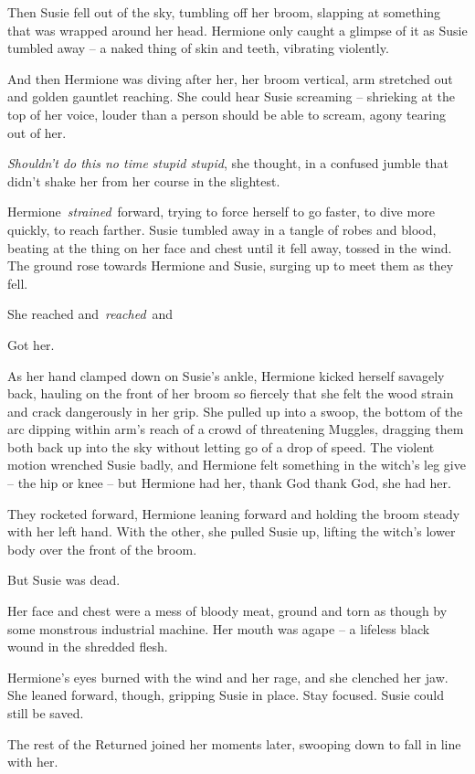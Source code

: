 Then Susie fell out of the sky, tumbling off her broom, slapping at
something that was wrapped around her head. Hermione only caught a
glimpse of it as Susie tumbled away -- a naked thing of skin and teeth,
vibrating violently.

And then Hermione was diving after her, her broom vertical, arm
stretched out and golden gauntlet reaching. She could hear Susie
screaming -- shrieking at the top of her voice, louder than a person
should be able to scream, agony tearing out of her.

\emph{Shouldn't do this no time stupid stupid}, she thought, in a
confused jumble that didn't shake her from her course in the slightest.

Hermione~\emph{strained}~forward, trying to force herself to go faster,
to dive more quickly, to reach farther. Susie tumbled away in a tangle
of robes and blood, beating at the thing on her face and chest until it
fell away, tossed in the wind. The ground rose towards Hermione and
Susie, surging up to meet them as they fell.

She reached and~\emph{reached}~and

Got her.

As her hand clamped down on Susie's ankle, Hermione kicked herself
savagely back, hauling on the front of her broom so fiercely that she
felt the wood strain and crack dangerously in her grip. She pulled up
into a swoop, the bottom of the arc dipping within arm's reach of a
crowd of threatening Muggles, dragging them both back up into the sky
without letting go of a drop of speed. The violent motion wrenched Susie
badly, and Hermione felt something in the witch's leg give -- the hip or
knee -- but Hermione had her, thank God thank God, she had her.

They rocketed forward, Hermione leaning forward and holding the broom
steady with her left hand. With the other, she pulled Susie up, lifting
the witch's lower body over the front of the broom.

But Susie was dead.

Her face and chest were a mess of bloody meat, ground and torn as though
by some monstrous industrial machine. Her mouth was agape -- a lifeless
black wound in the shredded flesh.

Hermione's eyes burned with the wind and her rage, and she clenched her
jaw. She leaned forward, though, gripping Susie in place. Stay focused.
Susie could still be saved.

The rest of the Returned joined her moments later, swooping down to fall
in line with her.

